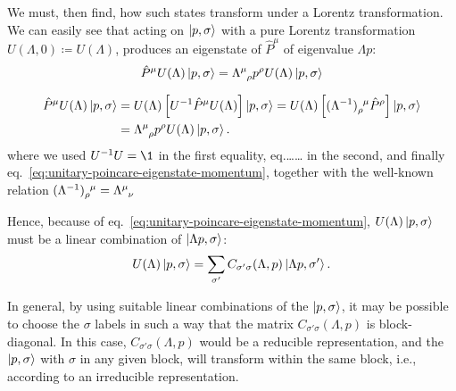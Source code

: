 We must, then find, how such states transform under a Lorentz transformation. We can easily see that acting on $\ket{p,\sigma}$ with a pure Lorentz transformation $U(\Lambda,0) \coloneq U(\Lambda)$, produces an eigenstate of $\hat{P}^\mu$ of eigenvalue $\Lambda p$:
\begin{equation}
    \hat{P}^\mu U(\Lambda) \ket{p,\sigma} = \tensor{\Lambda}{^\mu_\rho} p^\rho U(\Lambda) \ket{p,\sigma}
\end{equation}
\begin{mdframed}
\begin{innerproof}
    \begin{equation*}
    \begin{split}
        \hat{P}^\mu U(\Lambda) \ket{p,\sigma} &= U(\Lambda) \left[U^{-1} \hat{P}^\mu U(\Lambda)\right] \ket{p,\sigma} = U(\Lambda) \left[ \tensor{(\Lambda^{-1})}{_\rho^\mu} \hat{P}^\rho \right] \ket{p,\sigma}  \\
        &= \tensor{\Lambda}{^\mu_\rho} p^\rho U(\Lambda) \ket{p,\sigma} .
    \end{split}
    \end{equation*}
    where we used $U^{-1}U=\1$ in the first equality, eq.\color{red}\dots\dots\color{black} in the second, and finally eq.~\eqref{eq:unitary-poincare-eigenstate-momentum}, together with the well-known relation $\tensor{(\Lambda^{-1})}{_\rho^\mu} = \tensor{\Lambda}{^\mu_\nu}$
\end{innerproof}
\end{mdframed}

Hence, because of eq.~\eqref{eq:unitary-poincare-eigenstate-momentum}, $U(\Lambda)\ket{p,\sigma}$ must be a linear combination of $\ket{\Lambda p,\sigma}$:
\begin{equation}\label{eq:temp-1}
    U(\Lambda)\ket{p,\sigma} =  \sum_{\sigma'} C_{\sigma' \sigma} (\Lambda, p) \ket{\Lambda p,\sigma'}.
\end{equation}

In general, by using suitable linear combinations of the $\ket{p,\sigma}$, it may be possible to choose the $\sigma$ labels in such a way that the matrix $C_{\sigma' \sigma} (\Lambda, p)$ is block-diagonal. In this case, $C_{\sigma' \sigma} (\Lambda, p)$ would be a reducible representation, and the $\ket{p,\sigma}$ with $\sigma$ in any given block, will transform within the same block, i.e., according to an irreducible representation. 

